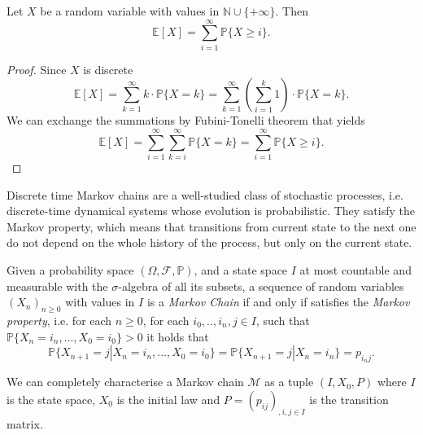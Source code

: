 \begin{LONG}
\begin{proposition}
		Let $X$ be a random variable with values in $\mathbb{N}\cup \{+\infty\}$. Then
		$$
		\mathbb{E}[X]=\sum\limits_{i=1}^{\infty} \mathbb{P}\{X\geq i\}.
		$$
	\end{proposition}
	\begin{proof}
		Since $X$ is discrete 
		$$
		\mathbb{E}[X]=\sum\limits_{k=1}^{\infty} k\cdot\mathbb{P}\{X=k\} =  \sum\limits_{k=1}^{\infty} \left( \sum\limits_{i=1}^{k} 1\right) \cdot\mathbb{P}\{X=k\}.
		$$
		We can exchange the summations by Fubini-Tonelli theorem that yields 
		$$
		\mathbb{E}[X]=\sum\limits_{i=1}^{\infty} \sum\limits_{k=i}^{\infty} \mathbb{P}\{X=k\} = \sum\limits_{i=1}^{\infty} \mathbb{P}\{X\geq i\}.
		$$
	\end{proof}
	Discrete time Markov chains are a well-studied class of stochastic processes, i.e. discrete-time dynamical systems whose evolution is probabilistic. They satisfy the Markov property, which means that transitions from current state to the next one do not depend on the whole history of the process, but only on the current state.
	\begin{definition}
		Given a probability space $(\Omega, \mathcal{F},\mathbb{P})$, and a state space $I$ at most countable and measurable with the $\sigma$-algebra of all its subsets, a sequence of random variables $(X_n)_{n\geq 0}$ with values in $I$ is a\emph{ Markov Chain} if and only if satisfies the \emph{Markov property}, i.e. for each $n\geq 0$, for each $i_0,..,i_n,j \in I$, such that $\mathbb{P}\{X_n=i_n,...,X_0=i_0\}>0$ it holds that
		$$
		\mathbb{P}\{X_{n+1}=j|X_n=i_n,...,X_0=i_0\}=\mathbb{P}\{X_{n+1}=j|X_n=i_n\}=p_{{i_n}j}.
		$$
	\end{definition}
	We can completely characterise a Markov chain $\mathcal{M}$ as a tuple $(I,X_0,P)$ where $I$ is the state space, $X_0$ is the initial law and $P=(p_{ij})_{,i,j\in I}$ is the transition matrix.
	

\end{LONG}
